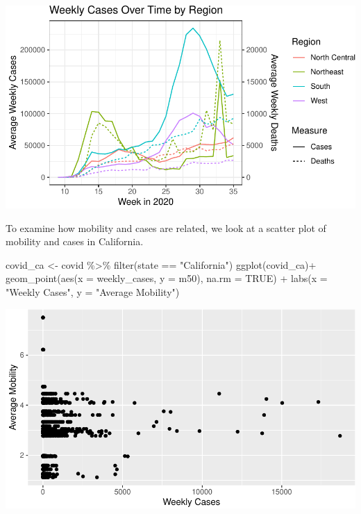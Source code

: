 \documentclass[
  letterpaper,
]{latex/krantz}
\makeatletter
\newenvironment{Shaded}{\begin{snugshade}}{\end{snugshade}}
\newcommand{\AttributeTok}[1]{\textcolor[rgb]{0.40,0.45,0.13}{#1}}
\newcommand{\ConstantTok}[1]{\textcolor[rgb]{0.56,0.35,0.01}{#1}}
\newcommand{\FunctionTok}[1]{\textcolor[rgb]{0.28,0.35,0.67}{#1}}
\newcommand{\NormalTok}[1]{\textcolor[rgb]{0.00,0.23,0.31}{#1}}
\newcommand{\OtherTok}[1]{\textcolor[rgb]{0.00,0.23,0.31}{#1}}
\newcommand{\SpecialCharTok}[1]{\textcolor[rgb]{0.37,0.37,0.37}{#1}}
\newcommand{\StringTok}[1]{\textcolor[rgb]{0.13,0.47,0.30}{#1}}
\newenvironment{kframe}{%
\medskip{}
\setlength{\fboxsep}{.8em}
 \def\at@end@of@kframe{}%
 \ifinner\ifhmode%
  \def\at@end@of@kframe{\end{minipage}}%
  \begin{minipage}{\columnwidth}%
 \fi\fi%
 \def\FrameCommand##1{\hskip\@totalleftmargin \hskip-\fboxsep
 \colorbox{shadecolor}{##1}\hskip-\fboxsep
     \hskip-\linewidth \hskip-\@totalleftmargin \hskip\columnwidth}%
 \MakeFramed {\advance\hsize-\width
   \@totalleftmargin\z@ \linewidth\hsize
   \@setminipage}}%
 {\par\unskip\endMakeFramed%
 \at@end@of@kframe}
\renewenvironment{Shaded}{\begin{kframe}}{\end{kframe}}
\makeatother
\begin{document}
\begin{center}
\includegraphics[width=1\textwidth,height=\textheight]{book/cs_eda_files/figure-pdf/unnamed-chunk-14-1.pdf}
\end{center}

To examine how mobility and cases are related, we look at a scatter plot
of mobility and cases in California.

\begin{Shaded}
\begin{Highlighting}[]
\NormalTok{covid\_ca }\OtherTok{\textless{}{-}}\NormalTok{ covid }\SpecialCharTok{\%\textgreater{}\%} \FunctionTok{filter}\NormalTok{(state }\SpecialCharTok{==} \StringTok{"California"}\NormalTok{)}
\FunctionTok{ggplot}\NormalTok{(covid\_ca)}\SpecialCharTok{+}
  \FunctionTok{geom\_point}\NormalTok{(}\FunctionTok{aes}\NormalTok{(}\AttributeTok{x =}\NormalTok{ weekly\_cases, }\AttributeTok{y =}\NormalTok{ m50), }\AttributeTok{na.rm =} \ConstantTok{TRUE}\NormalTok{) }\SpecialCharTok{+}
  \FunctionTok{labs}\NormalTok{(}\AttributeTok{x =} \StringTok{"Weekly Cases"}\NormalTok{, }\AttributeTok{y =} \StringTok{"Average Mobility"}\NormalTok{)}
\end{Highlighting}
\end{Shaded}

\begin{center}
\includegraphics[width=1\textwidth,height=\textheight]{book/cs_eda_files/figure-pdf/unnamed-chunk-15-1.pdf}
\end{center}
\end{document}
